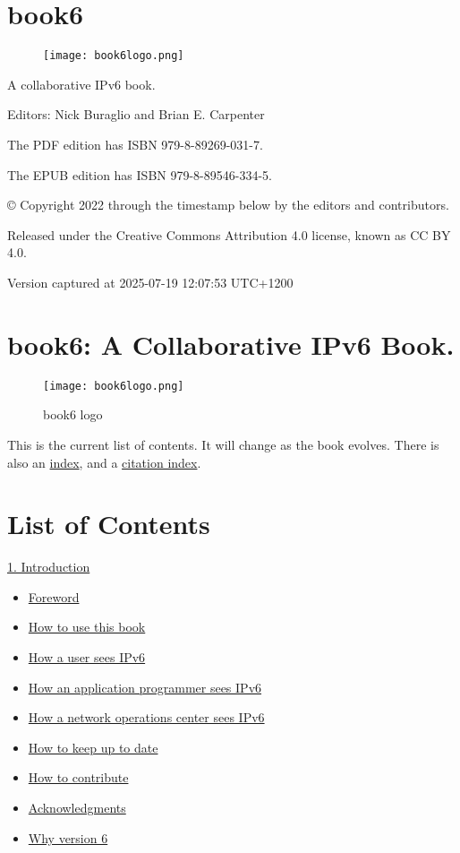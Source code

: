 \documentclass[
]{article}
\author{}
\date{}
\providecommand{\tightlist}{%
  \setlength{\itemsep}{0pt}\setlength{\parskip}{0pt}}
\begin{document}
\section{book6}\label{book6}

\begin{figure}
\centering
\texttt{[image: book6logo.png]}
\caption{}
\end{figure}

A collaborative IPv6 book.

Editors: Nick Buraglio and Brian E. Carpenter

The PDF edition has ISBN 979-8-89269-031-7.

The EPUB edition has ISBN 979-8-89546-334-5.

© Copyright 2022 through the timestamp below by the editors and
contributors.

Released under the Creative Commons Attribution 4.0 license, known as CC
BY 4.0.

Version captured at 2025-07-19 12:07:53 UTC+1200

\pagebreak

\section{book6: A Collaborative IPv6
Book.}\label{book6-a-collaborative-ipv6-book}

\begin{figure}
\centering
\texttt{[image: book6logo.png]}
\caption{book6 logo}
\end{figure}

This is the current list of contents. It will change as the book
evolves. There is also an \hyperref[book6-main-index]{index}, and a
\hyperref[book6-citation-index]{citation index}.

\section{List of Contents}\label{list-of-contents}

\hyperref[introduction-and-foreword]{1. Introduction}

\begin{itemize}
\tightlist
\item
  \hyperref[foreword]{Foreword}
\item
  \hyperref[how-to-use-this-book]{How to use this book}
\item
  \hyperref[how-a-user-sees-ipv6]{How a user sees IPv6}
\item
  \hyperref[how-an-application-programmer-sees-ipv6]{How an application
  programmer sees IPv6}
\item
  \hyperref[how-a-network-operations-center-sees-ipv6]{How a network
  operations center sees IPv6}
\item
  \hyperref[how-to-keep-up-to-date]{How to keep up to date}
\item
  \hyperref[how-to-contribute]{How to contribute}
\item
  \hyperref[acknowledgments]{Acknowledgments}
\item
  \hyperref[why-version-6]{Why version 6}
\end{itemize}
\end{document}
